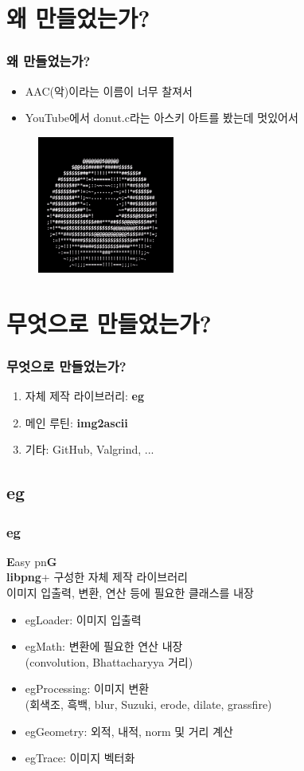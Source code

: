\documentclass{beamer}
\newcommand{\spacing}{\hspace{0.3em}}
\newcommand{\eg}{\textbf{eg}}
\newcommand{\imgascii}{\textbf{img2ascii}}
\newcommand{\libpng}{\textbf{libpng}}
\newcommand{\Eigen}{\textbf{Eigen}}
\begin{document}
\section{왜 만들었는가?}
\begin{frame}{}
	\frametitle{왜 만들었는가?}
	\begin{itemize}
		\item AAC(악)이라는 이름이 너무 찰져서
		\item YouTube에서 donut.c라는 아스키 아트를 봤는데 멋있어서\cite{donut}
	\end{itemize}
	\begin{figure}
		\centering
		\includegraphics[width=4.5cm, height=4.5cm]{Donut.png}
	\end{figure}
\end{frame}

\section{무엇으로 만들었는가?}
\begin{frame}{}
	\frametitle{무엇으로 만들었는가?}
	\begin{enumerate}
		\item 자체 제작 라이브러리: \eg
		\item 메인 루틴: \imgascii
		\item 기타: GitHub, Valgrind, ...
	\end{enumerate}
\end{frame}

	\subsection{\eg}
	\begin{frame}{}
		\frametitle{\eg}
		\textbf{E}asy pn\textbf{G} \\
		\libpng \spacing +  구성한 자체 제작 라이브러리 \\
		이미지 입출력, 변환, 연산 등에 필요한 클래스를 내장
		\vspace{1em}
		\begin{itemize}
			\item egLoader: 이미지 입출력
			\item egMath: 변환에 필요한 연산 내장 \\ (convolution, Bhattacharyya 거리)
			\item egProcessing: 이미지 변환 \\ (회색조, 흑백, blur, Suzuki, erode, dilate, grassfire)
			\item egGeometry: 외적, 내적, norm 및 거리 계산
			\item egTrace: 이미지 벡터화
		\end{itemize}
	\end{frame}
\end{document}
